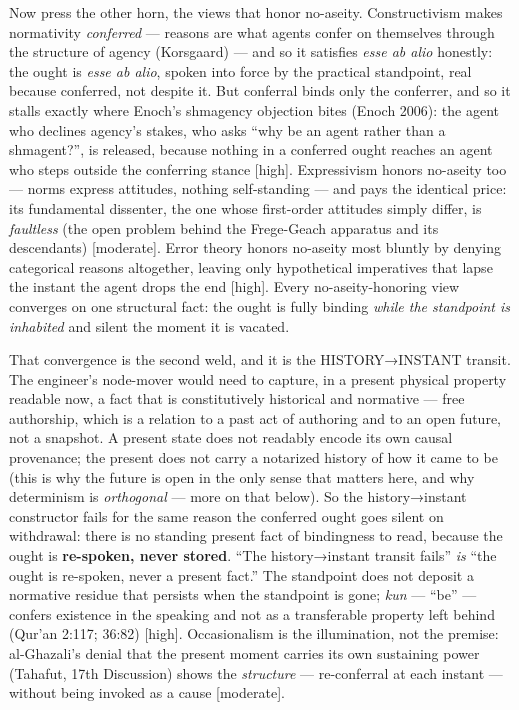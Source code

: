 \documentclass[11pt]{article}
\begin{document}
Now press the other horn, the views that honor no-aseity. Constructivism makes normativity \emph{conferred} — reasons are what agents confer on themselves through the structure of agency (Korsgaard) — and so it satisfies \emph{esse ab alio} honestly: the ought is \emph{esse ab alio}, spoken into force by the practical standpoint, real because conferred, not despite it. But conferral binds only the conferrer, and so it stalls exactly where Enoch's shmagency objection bites (Enoch 2006): the agent who declines agency's stakes, who asks ``why be an agent rather than a shmagent?'', is released, because nothing in a conferred ought reaches an agent who steps outside the conferring stance [high]. Expressivism honors no-aseity too — norms express attitudes, nothing self-standing — and pays the identical price: its fundamental dissenter, the one whose first-order attitudes simply differ, is \emph{faultless} (the open problem behind the Frege-Geach apparatus and its descendants) [moderate]. Error theory honors no-aseity most bluntly by denying categorical reasons altogether, leaving only hypothetical imperatives that lapse the instant the agent drops the end [high]. Every no-aseity-honoring view converges on one structural fact: the ought is fully binding \emph{while the standpoint is inhabited} and silent the moment it is vacated.

That convergence is the second weld, and it is the HISTORY→INSTANT transit. The engineer's node-mover would need to capture, in a present physical property readable now, a fact that is constitutively historical and normative — free authorship, which is a relation to a past act of authoring and to an open future, not a snapshot. A present state does not readably encode its own causal provenance; the present does not carry a notarized history of how it came to be (this is why the future is open in the only sense that matters here, and why determinism is \emph{orthogonal} — more on that below). So the history→instant constructor fails for the same reason the conferred ought goes silent on withdrawal: there is no standing present fact of bindingness to read, because the ought is \textbf{re-spoken, never stored}. ``The history→instant transit fails'' \emph{is} ``the ought is re-spoken, never a present fact.'' The standpoint does not deposit a normative residue that persists when the standpoint is gone; \emph{kun} — ``be'' — confers existence in the speaking and not as a transferable property left behind (Qur'an 2:117; 36:82) [high]. Occasionalism is the illumination, not the premise: al-Ghazali's denial that the present moment carries its own sustaining power (Tahafut, 17th Discussion) shows the \emph{structure} — re-conferral at each instant — without being invoked as a cause [moderate].
\end{document}
